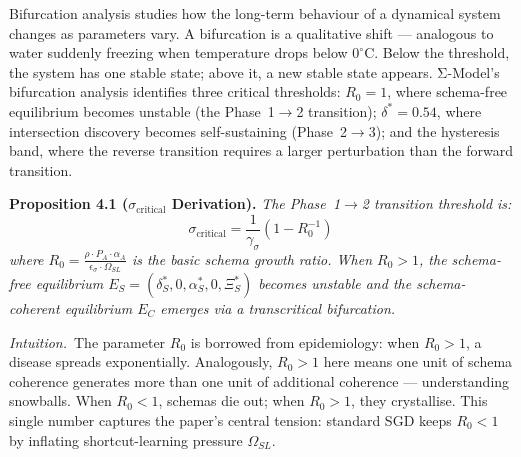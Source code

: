 Bifurcation analysis \citep{kuznetsov1998} studies how the long-term behaviour of a dynamical system changes as parameters vary. A bifurcation is a qualitative shift --- analogous to water suddenly freezing when temperature drops below $0^\circ$C. Below the threshold, the system has one stable state; above it, a new stable state appears. Σ-Model's bifurcation analysis identifies three critical thresholds: $R_0 = 1$, where schema-free equilibrium becomes unstable (the Phase~1$\to$2 transition); $\delta^* = 0.54$, where intersection discovery becomes self-sustaining (Phase~2$\to$3); and the hysteresis band, where the reverse transition requires a larger perturbation than the forward transition.

\textbf{Proposition 4.1 ($\sigma_{\text{critical}}$ Derivation).} %
\textit{The Phase~1$\to$2 transition threshold is:
\begin{equation}\label{eq:sigma-critical-derived}
\sigma_{\text{critical}} = \frac{1}{\gamma_\sigma}(1 - R_0^{-1})
\end{equation}
where $R_0 = \frac{\rho \cdot P_A \cdot \alpha_A}{\epsilon_\sigma \cdot \Omega_{SL}}$ is the
basic schema growth ratio. When $R_0 > 1$, the schema-free
equilibrium $E_S = (\delta_S^*, 0, \alpha_S^*, 0, \Xi_S^*)$ becomes unstable
and the schema-coherent equilibrium $E_C$ emerges via a transcritical
bifurcation.}

\noindent\textit{Intuition.}\ The parameter $R_0$ is borrowed from
epidemiology: when $R_0 > 1$, a disease spreads exponentially.
Analogously, $R_0 > 1$ here means one unit of schema coherence generates
more than one unit of additional coherence --- understanding snowballs.
When $R_0 < 1$, schemas die out; when $R_0 > 1$, they crystallise.
This single number captures the paper's central tension: standard SGD
keeps $R_0 < 1$ by inflating shortcut-learning pressure $\Omega_{SL}$.

